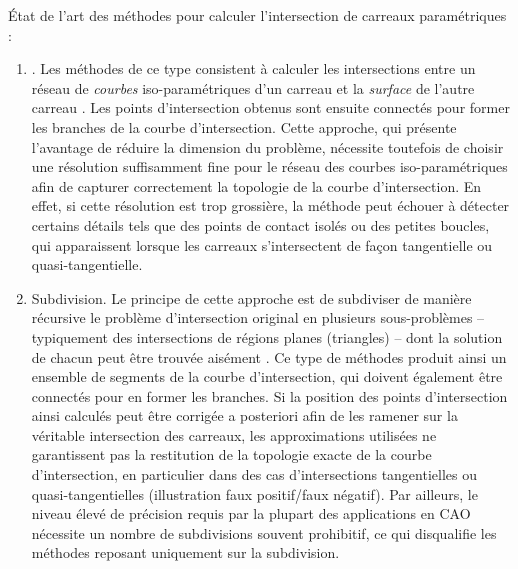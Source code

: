 État de l'art des méthodes pour calculer l'intersection de carreaux paramétriques :
\begin{enumerate}
	\item {}. 
	Les méthodes de ce type consistent à calculer les intersections entre un réseau de \textit{courbes} iso-paramétriques d'un carreau et la \textit{surface} de l'autre carreau \cite{rossignac1987}. 
	Les points d'intersection obtenus sont ensuite connectés pour former les branches de la courbe d'intersection. 
	Cette approche, qui présente l'avantage de réduire la dimension du problème, nécessite toutefois de choisir une résolution suffisamment fine pour le réseau des courbes iso-paramétriques afin de capturer correctement la topologie de la courbe d'intersection. 
	En effet, si cette résolution est trop grossière, la méthode peut échouer à détecter certains détails tels que des points de contact isolés ou des petites boucles, qui apparaissent lorsque les carreaux s'intersectent de façon tangentielle ou quasi-tangentielle.
	
	\item Subdivision.
	Le principe de cette approche est de subdiviser de manière récursive le problème d'intersection original en plusieurs sous-problèmes -- typiquement des intersections de régions planes (\eg triangles) -- dont la solution de chacun peut être trouvée aisément \cite{houghton1985}. 
	Ce type de méthodes produit ainsi un ensemble de segments de la courbe d'intersection, qui doivent également être connectés pour en former les branches. 
	Si la position des points d'intersection ainsi calculés peut être corrigée a posteriori afin de les ramener sur la véritable intersection des carreaux, les approximations utilisées ne garantissent pas la restitution de la topologie exacte de la courbe d'intersection, en particulier dans des cas d'intersections tangentielles ou quasi-tangentielles (illustration faux positif/faux négatif).
	Par ailleurs, le niveau élevé de précision requis par la plupart des applications en CAO nécessite un nombre de subdivisions souvent prohibitif, ce qui disqualifie les méthodes reposant uniquement sur la subdivision.


\end{enumerate}
